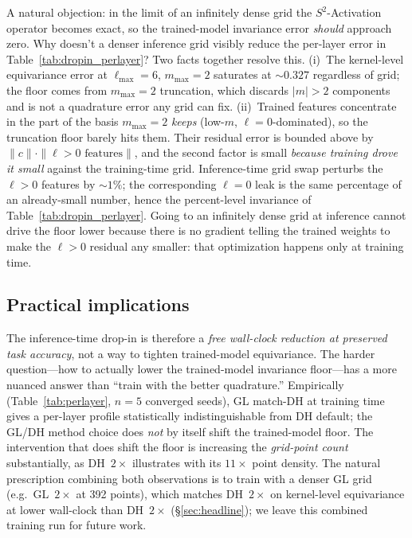\documentclass{article}
\begin{document}
A natural objection: in the limit of an infinitely dense grid the
$S^2$-Activation operator becomes exact, so the trained-model
invariance error \emph{should} approach zero. Why doesn't a denser
inference grid visibly reduce the per-layer error in
Table~\ref{tab:dropin_perlayer}? Two facts together resolve this.
(i)~The kernel-level equivariance error at $\ell_{\max}{=}6$,
$m_{\max}{=}2$ saturates at $\sim 0.327$ regardless of grid; the
floor comes from $m_{\max}{=}2$ truncation, which discards $|m| > 2$
components and is not a quadrature error any grid can fix.
(ii)~Trained features concentrate in the part of the basis
$m_{\max}{=}2$ \emph{keeps} (low-$m$, $\ell{=}0$-dominated), so the
truncation floor barely hits them. Their residual error is bounded
above by $\|c\| \cdot \|\ell{>}0\text{ features}\|$, and the second
factor is small \emph{because training drove it small} against the
training-time grid. Inference-time grid swap perturbs the
$\ell{>}0$ features by $\sim 1\%$; the corresponding $\ell{=}0$
leak is the same percentage of an already-small number, hence the
percent-level invariance of Table~\ref{tab:dropin_perlayer}. Going
to an infinitely dense grid at inference cannot drive the floor
lower because there is no gradient telling the trained weights to
make the $\ell{>}0$ residual any smaller: that optimization happens
only at training time.

\subsection{Practical implications}

The inference-time drop-in is therefore a \emph{free wall-clock
reduction at preserved task accuracy}, not a way to tighten
trained-model equivariance. The harder question---how to actually
lower the trained-model invariance floor---has a more nuanced answer
than ``train with the better quadrature.''
Empirically (Table~\ref{tab:perlayer}, $n=5$ converged seeds), GL
match-DH at training time gives a per-layer profile statistically
indistinguishable from DH default; the GL/DH method choice does
\emph{not} by itself shift the trained-model floor. The intervention
that does shift the floor is increasing the \emph{grid-point count}
substantially, as DH~$2\times$ illustrates with its $11\times$ point
density. The natural prescription combining both observations is to
train with a denser GL grid (e.g.~GL~$2\times$ at 392 points), which
matches DH~$2\times$ on kernel-level equivariance at lower wall-clock
than DH~$2\times$ (\S\ref{sec:headline}); we leave this combined
training run for future work.
\end{document}
